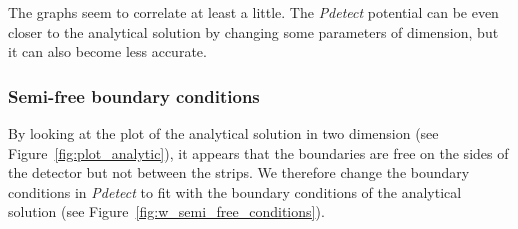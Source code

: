\documentclass[11pt]{article}
\begin{document}
\newpage
			The graphs seem to correlate at least a little. The \textit{Pdetect} potential can
			be even closer to the analytical solution by changing some parameters of dimension,
			but it can also become less accurate.

		\subsubsection{Semi-free boundary conditions}

			By looking at the plot of the analytical solution in two dimension
			(see Figure~\ref{fig:plot_analytic}), it appears that the boundaries are
			free on the sides of the detector but not between the strips. We therefore change
			the boundary conditions in \textit{Pdetect} to fit with the boundary conditions of
			the analytical solution (see Figure~\ref{fig:w_semi_free_conditions}).
\end{document}
